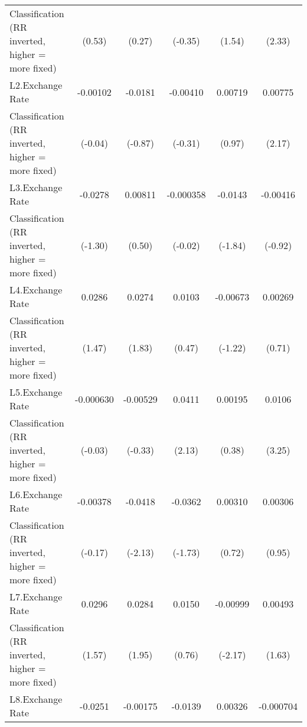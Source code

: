 {\begin{tabular}{l*{5}{c}}
Classification (RR inverted, higher = more fixed)&      (0.53)         &      (0.27)         &     (-0.35)         &      (1.54)         &      (2.33)         \\
[1em]
L2.Exchange Rate    &    -0.00102         &     -0.0181         &    -0.00410         &     0.00719         &     0.00775\sym{*}  \\
Classification (RR inverted, higher = more fixed)&     (-0.04)         &     (-0.87)         &     (-0.31)         &      (0.97)         &      (2.17)         \\
[1em]
L3.Exchange Rate    &     -0.0278         &     0.00811         &   -0.000358         &     -0.0143         &    -0.00416         \\
Classification (RR inverted, higher = more fixed)&     (-1.30)         &      (0.50)         &     (-0.02)         &     (-1.84)         &     (-0.92)         \\
[1em]
L4.Exchange Rate    &      0.0286         &      0.0274         &      0.0103         &    -0.00673         &     0.00269         \\
Classification (RR inverted, higher = more fixed)&      (1.47)         &      (1.83)         &      (0.47)         &     (-1.22)         &      (0.71)         \\
[1em]
L5.Exchange Rate    &   -0.000630         &    -0.00529         &      0.0411\sym{*}  &     0.00195         &      0.0106\sym{**} \\
Classification (RR inverted, higher = more fixed)&     (-0.03)         &     (-0.33)         &      (2.13)         &      (0.38)         &      (3.25)         \\
[1em]
L6.Exchange Rate    &    -0.00378         &     -0.0418\sym{*}  &     -0.0362         &     0.00310         &     0.00306         \\
Classification (RR inverted, higher = more fixed)&     (-0.17)         &     (-2.13)         &     (-1.73)         &      (0.72)         &      (0.95)         \\
[1em]
L7.Exchange Rate    &      0.0296         &      0.0284         &      0.0150         &    -0.00999\sym{*}  &     0.00493         \\
Classification (RR inverted, higher = more fixed)&      (1.57)         &      (1.95)         &      (0.76)         &     (-2.17)         &      (1.63)         \\
[1em]
L8.Exchange Rate    &     -0.0251         &    -0.00175         &     -0.0139         &     0.00326         &   -0.000704         \\

\end{tabular}}
